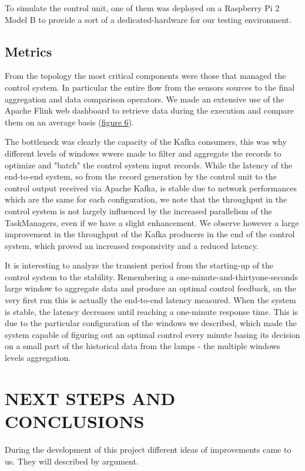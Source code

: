 To simulate the control unit, one of them was deployed on a Raspberry Pi 2 Model B to provide a sort of a dedicated-hardware for our testing environment.

\subsection{Metrics}
From the topology the most critical components were those that managed the control system. In particular the entire flow from the sensors sources to the final aggregation and data comparison operators. We made an extensive use of the Apache Flink web dashboard to retrieve data during the execution and compare them on an average basis (\hyperref[fig:ember_metrics]{figure 6}).

The bottleneck was clearly the capacity of the Kafka consumers, this was why different levels of windows wwere made to filter and aggregate the records to optimize and "batch" the control system input records. While the latency of the end-to-end system, so from the record generation by the control unit to the control output received via Apache Kafka, is stable due to network performances which are the same for each configuration, we note that the throughput in the control system is not largely influenced by the increased parallelism of the TaskManagers, even if we have a slight enhancement. We observe however a large improvement in the throughput of the Kafka producers in the end of the control system, which proved an increased responsivity and a reduced latency. 

It is interesting to analyze the transient period from the starting-up of the control system to the stability. Remembering a one-minute-and-thirtyone-seconds large window to aggregate data and produce an optimal control feedback, on the very first run this is actually the end-to-end latency measured. When the system is stable, the latency decreases until reaching a one-minute response time. This is due to the particular configuration of the windows we described, which made the system capable of figuring out an optimal control every minute basing its decision on a small part of the historical data from the lamps - the multiple windows levels aggregation.

\section{NEXT STEPS AND CONCLUSIONS}
During the development of this project different ideas of improvements came to us. They will described by argument.

